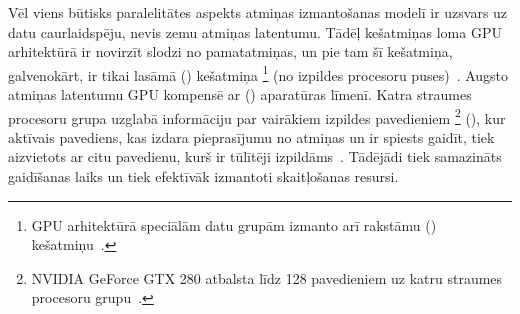 Vēl viens būtisks paralelitātes aspekts atmiņas izmantošanas modelī ir
uzsvars uz datu caurlaidspēju, nevis zemu atmiņas latentumu.
Tādēļ kešatmiņas loma GPU arhitektūrā ir novirzīt slodzi no
pamatatmiņas, un pie tam šī kešatmiņa, galvenokārt, ir tikai lasāmā
() kešatmiņa%
\footnote{GPU arhitektūrā speciālām datu grupām izmanto arī
	rakstāmu () kešatmiņu~\cite{Owens-GPU}.}
(no izpildes procesoru puses)~\cite{Fatahalian}.
Augsto atmiņas latentumu GPU kompensē
ar  () aparatūras līmenī.
Katra straumes procesoru grupa uzglabā informāciju
par vairākiem izpildes pavedieniem%
\footnote{NVIDIA GeForce GTX 280 atbalsta līdz 128 pavedieniem uz katru
	straumes procesoru grupu~\cite{Fatahalian}.}
(), kur aktīvais pavediens, kas izdara
pieprasījumu no atmiņas un ir spiests gaidīt, tiek aizvietots ar
citu pavedienu, kurš ir tūlītēji izpildāms~\cite{Fatahalian}.
Tādējādi tiek samazināts gaidīšanas laiks un tiek efektīvāk
izmantoti skaitļošanas resursi.
